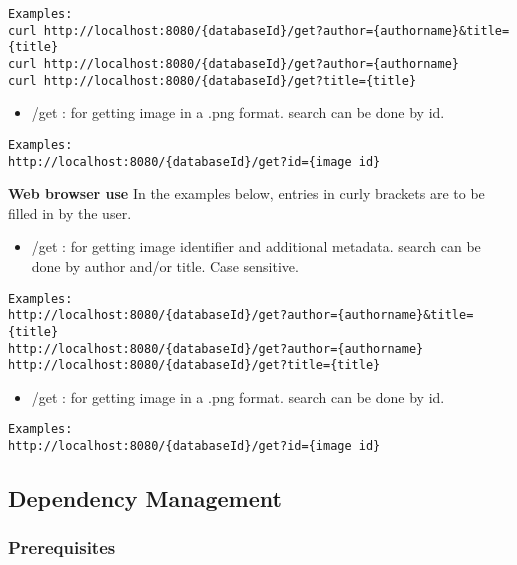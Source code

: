\begin{verbatim}
Examples: 
curl http://localhost:8080/{databaseId}/get?author={authorname}&title={title}
curl http://localhost:8080/{databaseId}/get?author={authorname}
curl http://localhost:8080/{databaseId}/get?title={title}
\end{verbatim}

\begin{itemize}
\tightlist
\item
   /get : for getting image in a .png format. search can be done by id. 
\end{itemize}

\begin{verbatim}
Examples: 
http://localhost:8080/{databaseId}/get?id={image id}
\end{verbatim}

\textbf{Web browser use} In the examples below, entries in curly
brackets are to be filled in by the user.

\begin{itemize}
\tightlist
\item
   /get : for getting image identifier and additional metadata. search
  can be done by author and/or title. Case sensitive. 
\end{itemize}

\begin{verbatim}
Examples: 
http://localhost:8080/{databaseId}/get?author={authorname}&title={title}
http://localhost:8080/{databaseId}/get?author={authorname}
http://localhost:8080/{databaseId}/get?title={title}
\end{verbatim}

\begin{itemize}
\tightlist
\item
   /get : for getting image in a .png format. search can be done by id. 
\end{itemize}

\begin{verbatim}
Examples: 
http://localhost:8080/{databaseId}/get?id={image id}
\end{verbatim}

\hypertarget{dependency-management}{%
\subsection{Dependency Management}\label{dependency-management}}

\hypertarget{prerequisites}{%
\subsubsection{Prerequisites}\label{prerequisites}}

